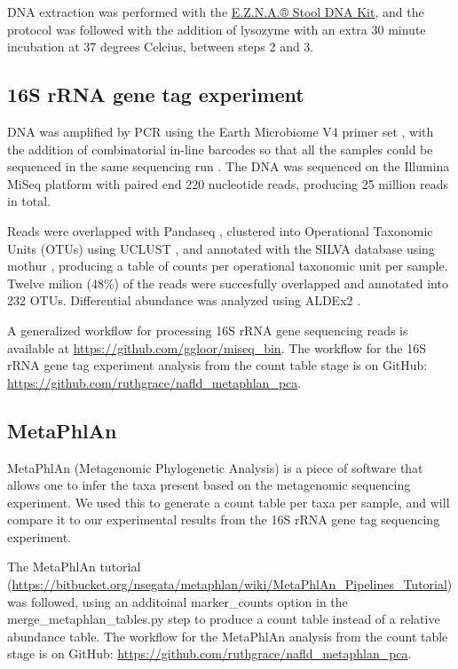DNA extraction was performed with the \href{http://omegabiotek.com/store/product/stool-dna-kit/}{E.Z.N.A.® Stool DNA Kit}, and the protocol was followed with the addition of lysozyme with an extra 30 minute incubation at 37 degrees Celcius, between steps 2 and 3.

\subsection{16S rRNA gene tag experiment}

DNA was amplified by PCR using the Earth Microbiome V4 primer set \cite{caporaso2012ultra}, with the addition of combinatorial in-line barcodes so that all the samples could be sequenced in the same sequencing run \cite{gloor2010microbiome}. The DNA was sequenced on the Illumina MiSeq platform with paired end 220 nucleotide reads, producing 25 million reads in total.

Reads were overlapped with Pandaseq \cite{masella2012pandaseq}, clustered into Operational Taxonomic Units (OTUs) using UCLUST \cite{edgar2010search}, and annotated with the SILVA database \cite{quast2013silva} using mothur \cite{schloss2009introducing}, producing a table of counts per operational taxonomic unit per sample. Twelve milion (48\%) of the reads were succesfully overlapped and annotated into 232 OTUs. Differential abundance was analyzed using ALDEx2 \cite{fernandes2014unifying}.

A generalized workflow for processing 16S rRNA gene sequencing reads is available at \url{https://github.com/ggloor/miseq_bin}. The workflow for the 16S rRNA gene tag experiment analysis from the count table stage is on GitHub: \url{https://github.com/ruthgrace/nafld_metaphlan_pca}.

\subsection{MetaPhlAn}

MetaPhlAn (Metagenomic Phylogenetic Analysis) \cite{segata2012metagenomic} is a piece of software that allows one to infer the taxa present based on the metagenomic sequencing experiment. We used this to generate a count table per taxa per sample, and will compare it to our experimental results from the 16S rRNA gene tag sequencing experiment.

The MetaPhlAn tutorial (\url{https://bitbucket.org/nsegata/metaphlan/wiki/MetaPhlAn_Pipelines_Tutorial}) was followed, using an additoinal marker_counts option in the merge_metaphlan_tables.py step to produce a count table instead of a relative abundance table. The workflow for the MetaPhlAn analysis from the count table stage is on GitHub: \url{https://github.com/ruthgrace/nafld_metaphlan_pca}.

